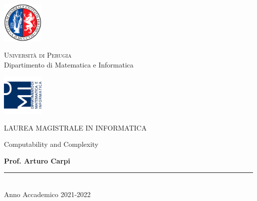 
\thispagestyle{empty} %

	\noindent %
	\includegraphics[width=0.15\textwidth]{tesi_stile/img/logoUniPg}
	\begin{minipage}[b]{0.7\textwidth}
		\centering
		{\Large \textcolor{blu_dmi}{\textsc{Universit{\`a} di Perugia}}}\\
		\vspace{0.4 em}
		{\large \textcolor{blu_dmi}{Dipartimento di Matematica e Informatica}}
		\vspace{0.6 em}
	\end{minipage}%
	\includegraphics[width=0.15\textwidth]{tesi_stile/img/logoDMI}
	
	\vspace{5 em}

	\begin{center}
		
		{\large \textcolor{blu_dmi}{\textsc{LAUREA MAGISTRALE IN INFORMATICA}}}\\
		\vspace{8 em}
		
	    {\Huge \textcolor{blu_dmi}{Computability and Complexity}}
        \vspace{8 em}
        
		{\textcolor{blu_dmi}{\textbf{Prof. Arturo Carpi}}}
		
		\vspace{4 em}
		\vfill
		
		\textcolor{blu_dmi}{\rule{380pt}{.4pt}}\\
		\vspace{1.2 em}
		\large{\textcolor{blu_dmi}{Anno Accademico 2021-2022}}
		
	\end{center}

